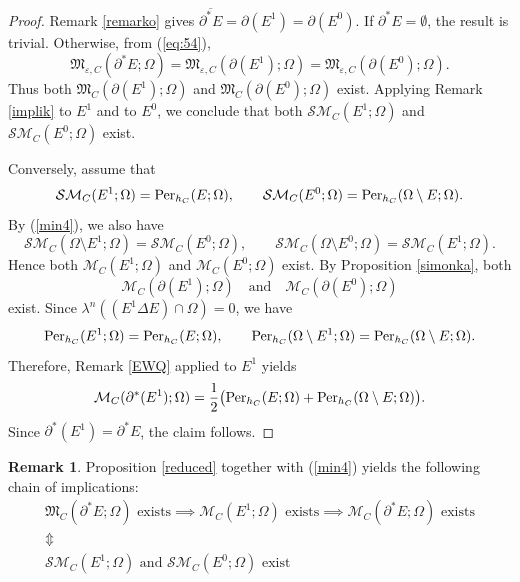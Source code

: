 \documentclass[pdflatex,sn-mathphys-num]{sn-jnl}
\theoremstyle{plain}
\theoremstyle{definition}
\newtheorem{rem}[theorem]{Remark}
\begin{document}
\begin{proof}
Remark \ref{remarko} gives $\overline{\partial^* E} = \partial(E^1) = \partial(E^0)$. If $\partial^* E = \emptyset$, the result is trivial. Otherwise, from (\ref{eq:54}),
\[
\mathfrak{M}_{\varepsilon, C}(\partial^* E; \Omega)=\mathfrak{M}_{\varepsilon, C}(\partial(E^1); \Omega)=\mathfrak{M}_{\varepsilon, C}(\partial(E^0); \Omega).
\]
 Thus both $\mathfrak{M}_C(\partial(E^1); \Omega)$ and $\mathfrak{M}_C(\partial(E^0); \Omega)$ exist. Applying Remark \ref{implik} to $E^1$ and to $E^0$, we conclude that both $\mathcal{SM}_C(E^1; \Omega)$ and $\mathcal{SM}_C(E^0; \Omega)$ exist.

Conversely, assume that
\[
\mathcal{SM}_C(E^1; \Omega)=\textup{Per}_{h_C}(E; \Omega), 
\qquad
\mathcal{SM}_C(E^0; \Omega)=\textup{Per}_{h_C}(\Omega\setminus E; \Omega).
\]
By (\ref{min4}), we also have
\[
\mathcal{SM}_C(\Omega\setminus E^1; \Omega)=\mathcal{SM}_C(E^0; \Omega),
\qquad
\mathcal{SM}_C(\Omega\setminus E^0; \Omega)=\mathcal{SM}_C(E^1; \Omega).
\]
Hence both $\mathscr{M}_C(E^1; \Omega)$ and $\mathscr{M}_C(E^0; \Omega)$ exist. By Proposition \ref{simonka}, both
\[
\mathcal{M}_C(\partial(E^1); \Omega)
\quad\text{and}\quad
\mathcal{M}_C(\partial(E^0); \Omega)
\]
exist. Since $\lambda^n((E^1\Delta E)\cap\Omega)=0$, we have
\[
\textup{Per}_{h_C}(E^1;\Omega)=\textup{Per}_{h_C}(E;\Omega),
\qquad
\textup{Per}_{h_C}(\Omega\setminus E^1;\Omega)=\textup{Per}_{h_C}(\Omega\setminus E;\Omega).
\]
Therefore, Remark \ref{EWQ} applied to $E^1$ yields
\[
\mathcal{M}_C(\partial^* (E^1); \Omega)
=
\frac{1}{2}\big(\textup{Per}_{h_C}(E; \Omega)+\textup{Per}_{h_C}(\Omega\setminus E; \Omega)\big).
\]
Since $\partial^*(E^1)=\partial^*E$, the claim follows.
\end{proof}


\begin{rem}
    Proposition \ref{reduced} together with (\ref{min4}) yields the following chain of implications:
    \begin{gather*} 
 \mathfrak{M}_{C}(\partial^* E; \Omega)\text{ exists}\implies\mathscr{M}_{C}(E^1; \Omega)\text{ exists}\implies\mathcal{M}_{C}(\partial^* E; \Omega)\text{ exists}\\
                    \Updownarrow                                         \\
    \mathcal{SM}_C(E^1; \Omega) \text{ and } \mathcal{SM}_C(E^0; \Omega)\text{ exist}
\end{gather*} 
\end{rem}
\end{document}
